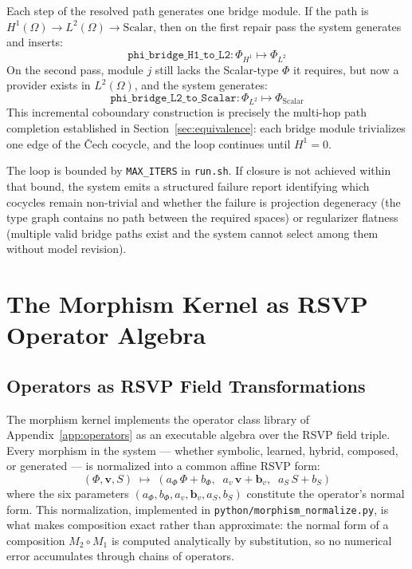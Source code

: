 \documentclass[11pt, oneside]{article}
\begin{document}
Each step of the resolved path generates one bridge module. If the path is
$H^1(\Omega) \to L^2(\Omega) \to \mathrm{Scalar}$, then on the first repair pass the
system generates and inserts:
\[
\texttt{phi\_bridge\_H1\_to\_L2} : \Phi_{H^1} \mapsto \Phi_{L^2}
\]
On the second pass, module $j$ still lacks the Scalar-type $\Phi$ it requires, but
now a provider exists in $L^2(\Omega)$, and the system generates:
\[
\texttt{phi\_bridge\_L2\_to\_Scalar} : \Phi_{L^2} \mapsto \Phi_{\mathrm{Scalar}}
\]
This incremental coboundary construction is precisely the multi-hop path completion
established in Section~\ref{sec:equivalence}: each bridge module trivializes one edge
of the \v{C}ech cocycle, and the loop continues until $H^1 = 0$.

The loop is bounded by \texttt{MAX\_ITERS} in \texttt{run.sh}. If closure is not
achieved within that bound, the system emits a structured failure report identifying
which cocycles remain non-trivial and whether the failure is projection degeneracy
(the type graph contains no path between the required spaces) or regularizer flatness
(multiple valid bridge paths exist and the system cannot select among them without
model revision).

\section{The Morphism Kernel as RSVP Operator Algebra}
\label{app:morphism_kernel}

\subsection{Operators as RSVP Field Transformations}

The morphism kernel implements the operator class library of Appendix~\ref{app:operators}
as an executable algebra over the RSVP field triple. Every morphism in the system ---
whether symbolic, learned, hybrid, composed, or generated --- is normalized into a
common affine RSVP form:
\[
(\Phi, \mathbf{v}, S) \;\mapsto\;
(a_\Phi\, \Phi + b_\Phi,\;\; a_v\, \mathbf{v} + \mathbf{b}_v,\;\; a_S\, S + b_S)
\]
where the six parameters $(a_\Phi, b_\Phi, a_v, \mathbf{b}_v, a_S, b_S)$ constitute the
operator's normal form. This normalization, implemented in \texttt{python/morphism\_normalize.py},
is what makes composition exact rather than approximate: the normal form of a composition
$M_2 \circ M_1$ is computed analytically by substitution, so no numerical error
accumulates through chains of operators.
\end{document}
